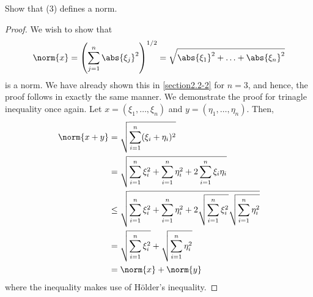 \begin{question}
    Show that (3) defines a norm.
    \label{section2.2-5}
\end{question}
\begin{proof}
    We wish to show that
    \[\norm{x} = \left(\sum_{j=1}^n \abs{\xi_j}^2 \right)^{1/2} = \sqrt{\abs{\xi_1}^2 + \ldots + \abs{\xi_n}^2}\]
    is a norm. We have already shown this in \ref{section2.2-2} for $n = 3$, and hence, the proof follows in exactly the same manner. We demonstrate the proof for trinagle inequality once again. Let $x = (\xi_1 , \ldots , \xi_n)$ and $y = (\eta_1 , \ldots , \eta_n)$. Then,
    \begin{align*}
        \norm{x + y} &= \sqrt{\sum_{i=1}^n (\xi_i + \eta_i)^2}
        \\
        &= \sqrt{\sum_{i=1}^n \xi_i^2 + \sum_{i=1}^n \eta_i^2 + 2 \sum_{i=1}^n \xi_i\eta_i}
        \\
        &\leq \sqrt{\sum_{i=1}^n \xi_i^2 + \sum_{i=1}^n \eta_i^2 + 2 \sqrt{\sum_{i=1}^n \xi_i^2}\sqrt{\sum_{i=1}^n \eta_i^2}}
        \\
        &= \sqrt{\sum_{i=1}^n \xi_i^2} + \sqrt{\sum_{i=1}^n \eta_i^2}
        \\
        &= \norm{x} + \norm{y}
    \end{align*}
    where the inequality makes use of Hölder's inequality.
    
\end{proof}

